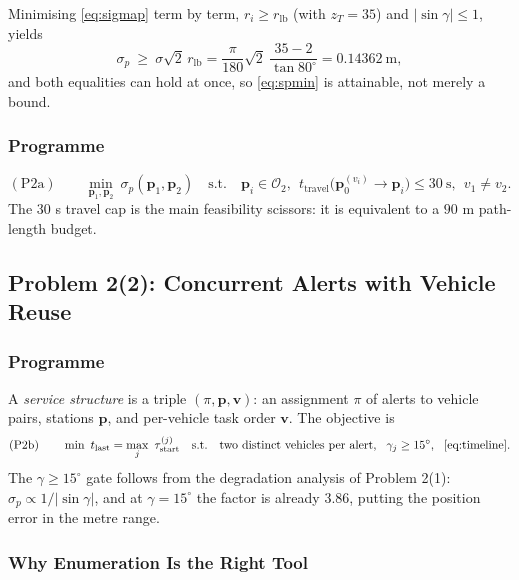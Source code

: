 \documentclass[12pt]{article}
\begin{document}
Minimising \eqref{eq:sigmap} term by term, $r_i\ge r_{\mathrm{lb}}$ (with $z_T=35$) and $|\sin\gamma|\le1$, yields
\begin{equation}
\label{eq:spmin}
\sigma_p\ \ge\ \sigma\sqrt2\,r_{\mathrm{lb}}
=\frac{\pi}{180}\sqrt2\ \frac{35-2}{\tan80^\circ}=0.14362\ \mathrm{m},
\end{equation}
and both equalities can hold at once, so \eqref{eq:spmin} is attainable, not merely a bound.

\subsubsection{Programme}

\begin{equation}
\label{eq:p2a}
(\mathrm{P2a})\qquad
\min_{\bm p_1,\bm p_2}\ \sigma_p(\bm p_1,\bm p_2)
\quad\text{s.t.}\quad
\bm p_i\in\mathcal O_2,\ \ t_{\mathrm{travel}}\big(\bm p_0^{(v_i)}\to\bm p_i\big)\le30\ \mathrm{s},\ \ v_1\neq v_2 .
\end{equation}
The $30$ s travel cap is the main feasibility scissors: it is equivalent to a $90$ m path-length budget.

\subsection{Problem 2(2): Concurrent Alerts with Vehicle Reuse}

\subsubsection{Programme}

A \emph{service structure} is a triple $(\pi,\bm p,\bm v)$: an assignment $\pi$ of alerts to vehicle pairs, stations $\bm p$, and per-vehicle task order $\bm v$. The objective is
\begin{equation}
\label{eq:p2b}
(\mathrm{P2b})\qquad
\min\ t_{\mathrm{last}}=\max_{j}\ \tau^{(j)}_{\mathrm{start}}
\quad\text{s.t.}\quad
\text{two distinct vehicles per alert},\ \ \gamma_j\ge15^\circ,\ \ \eqref{eq:timeline}.
\end{equation}
The $\gamma\ge15^\circ$ gate follows from the degradation analysis of Problem 2(1): $\sigma_p\propto1/|\sin\gamma|$, and at $\gamma=15^\circ$ the factor is already $3.86$, putting the position error in the metre range.

\subsubsection{Why Enumeration Is the Right Tool}
\end{document}
